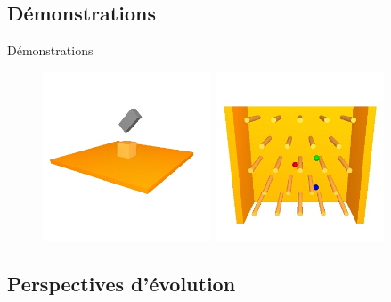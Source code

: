 \documentclass{beamer}
\begin{document}
\subsection{Démonstrations}

\begin{frame}{Démonstrations}
  \begin{figure}
    \includegraphics[width=5cm]{images/box.jpg}
    \includegraphics[width=5cm]{images/pachinko.jpg}
  \end{figure}
\end{frame}

\subsection{Perspectives d'évolution}
\end{document}
